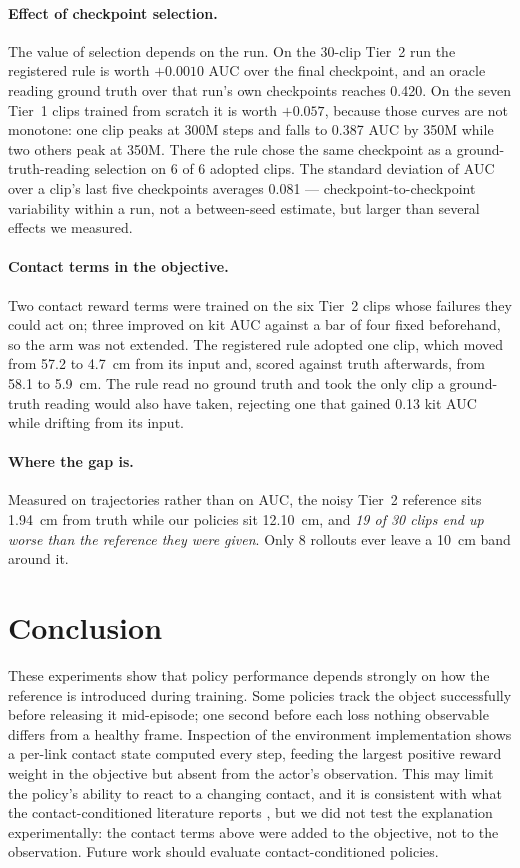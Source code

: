 \documentclass[10pt]{nvidiaextabstract}
\begin{document}
\paragraph{Effect of checkpoint selection.} The value of selection depends on the run. On the
30-clip Tier~2 run the registered rule is worth $+0.0010$ AUC over the final checkpoint, and an
oracle reading ground truth over that run's own checkpoints reaches 0.420. On the seven Tier~1
clips trained from scratch it is worth $+0.057$, because those curves are not monotone: one clip
peaks at 300M steps and falls to 0.387 AUC by 350M while two others peak at 350M. There the rule
chose the same checkpoint as a ground-truth-reading selection on 6 of 6 adopted clips. The standard deviation of AUC over a clip's last five checkpoints
averages 0.081 --- checkpoint-to-checkpoint variability within a run, not a between-seed estimate,
but larger than several effects we measured.


\paragraph{Contact terms in the objective.} Two contact reward terms were trained on the six
Tier~2 clips whose failures they could act on; three improved on kit AUC against a bar of four
fixed beforehand, so the arm was not extended. The registered rule adopted one clip, which moved
from 57.2 to 4.7~cm from its input and, scored against truth afterwards, from 58.1 to 5.9~cm. The
rule read no ground truth and took the only clip a ground-truth reading would also have taken,
rejecting one that gained 0.13 kit AUC while drifting from its input.

\paragraph{Where the gap is.} Measured on trajectories rather than on AUC, the noisy Tier~2
reference sits 1.94~cm from truth while our policies sit 12.10~cm, and \emph{19 of 30 clips end up worse than the reference they
were given}. Only 8 rollouts ever leave a 10~cm band around it.

\section{Conclusion}
\label{sec:conclusion}

These experiments show that policy performance depends strongly on how the reference is
introduced during training. Some policies track the object successfully before releasing it
mid-episode; one second before each loss nothing observable differs from a healthy frame. Inspection of the environment implementation shows a
per-link contact state computed every step, feeding the largest positive reward weight in the
objective but absent from the actor's observation. This may limit the policy's
ability to react to a changing contact, and it is consistent with what the contact-conditioned
literature reports \citep{physhoi,intermimic}, but we did not test the explanation
experimentally: the contact terms above were added to the objective, not to the observation. Future work should evaluate contact-conditioned policies.
\end{document}
